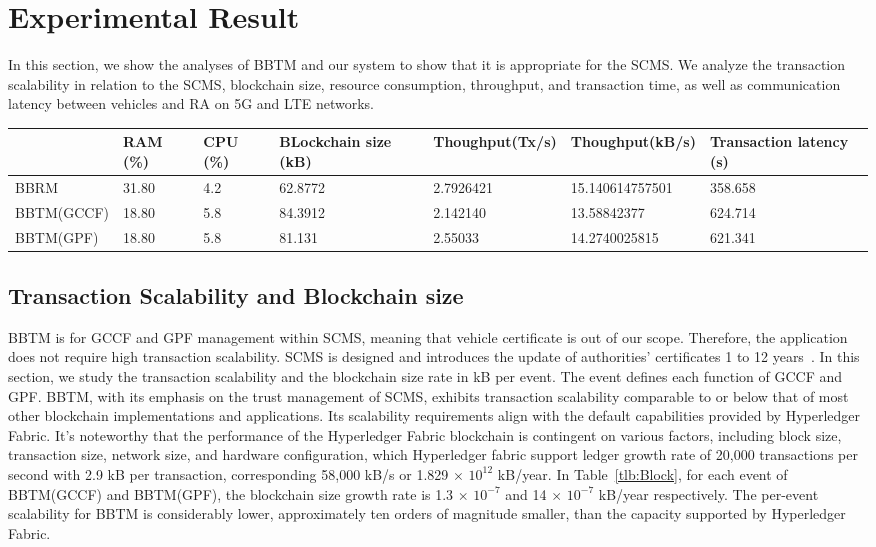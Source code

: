 \section{Experimental Result}
\label{analy}
In this section, we show the analyses of BBTM and our system to show that it is appropriate for the SCMS. We analyze the transaction scalability in relation to the SCMS, blockchain size, resource consumption, throughput, and transaction time, as well as communication latency between vehicles and RA on 5G and LTE networks.    

\captionsetup[table]{skip=12pt}
\begin{table*}[hbt!]
\small
\centering 
{\begin{tabular}{ |p{2cm}|p{1.6cm}|p{1.6cm}|p{2cm}|p{2.5cm}|p{2.5cm}|p{2cm}| } 
\hline
 & \textbf{RAM (\%)} & \textbf{CPU (\%)}& \textbf{BLockchain size (kB)}& \textbf{Thoughput(Tx/s)}& \textbf{Thoughput(kB/s)}& \textbf{Transaction latency (s)}\\\hline
BBRM~\cite{sarker2021blockchain} & 31.80 & 4.2 & 62.8772 & 2.7926421 & 15.140614757501 & 358.658 \\\hline
BBTM(GCCF) & 18.80 & 5.8 & 84.3912 & 2.142140 & 13.58842377 & 624.714 \\\hline
BBTM(GPF) & 18.80 & 5.8 & 81.131 & 2.55033 & 14.2740025815 & 621.341 \\\hline
\end{tabular}} 
\caption{Blockchain Performance}
\label{tlb:Block}
\end{table*}

\subsection{Transaction Scalability and Blockchain size}
BBTM is for GCCF and GPF management within SCMS, meaning that vehicle certificate is out of our scope. Therefore, the application does not require high transaction scalability. SCMS is designed and introduces the update of authorities' certificates 1 to 12 years~\cite{TimelineBenedikt}.
In this section, we study the transaction scalability and the blockchain size rate in kB per event.
The event defines each function of GCCF and GPF. BBTM, with its emphasis on the trust management of SCMS, exhibits transaction scalability comparable to or below that of most other blockchain implementations and applications. Its scalability requirements align with the default capabilities provided by Hyperledger Fabric. It's noteworthy that the performance of the Hyperledger Fabric blockchain is contingent on various factors, including block size, transaction size, network size, and hardware configuration, which Hyperledger fabric support ledger growth rate of 20,000 transactions per second with 2.9 kB per transaction, corresponding 58,000 kB/s or 1.829 $\times$ $10^{12}$ kB/year. In Table~\ref{tlb:Block}, for each event of BBTM(GCCF) and BBTM(GPF), the blockchain size growth rate is 1.3 $\times$ $10^{-7}$ and 14 $\times$ $10^{-7}$ kB/year respectively. The per-event scalability for BBTM is considerably lower, approximately ten orders of magnitude smaller, than the capacity supported by Hyperledger Fabric. 


